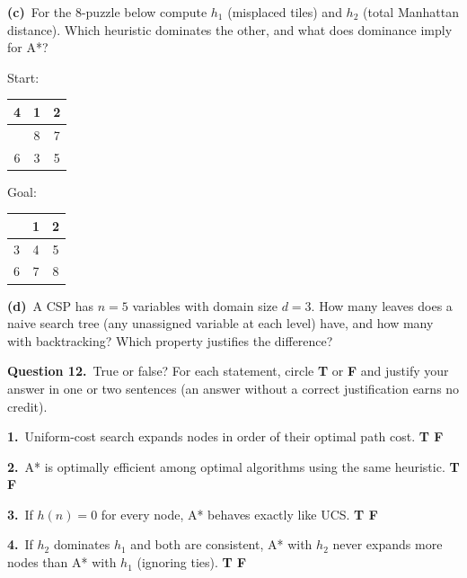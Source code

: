 \documentclass[11pt,a4paper]{article}
\renewcommand{\arraystretch}{1.25}
\newcommand{\question}[1]{\par\medskip\noindent\textbf{Question #1.}\ }
\newcommand{\subq}[1]{\par\smallskip\noindent\textbf{#1}\ }
\begin{document}
\subq{(c)}For the 8-puzzle below compute $h_1$ (misplaced tiles) and $h_2$ (total Manhattan distance). Which heuristic dominates the other, and what does dominance imply for A*?\par\begin{center}Start: {\renewcommand{\arraystretch}{1.3}\begin{tabular}{|c|c|c|}\hline 4 & 1 & 2 \\ \hline
 & 8 & 7 \\ \hline
6 & 3 & 5 \\ \hline\end{tabular}}\qquad Goal: {\renewcommand{\arraystretch}{1.3}\begin{tabular}{|c|c|c|}\hline  & 1 & 2 \\ \hline
3 & 4 & 5 \\ \hline
6 & 7 & 8 \\ \hline\end{tabular}}\end{center}
\begin{ansbox}[height=2.4cm]\end{ansbox}
\subq{(d)}A CSP has $n=5$ variables with domain size $d=3$. How many leaves does a naive search tree (any unassigned variable at each level) have, and how many with backtracking? Which property justifies the difference?
\begin{ansbox}[height=2.0cm]\end{ansbox}
\question{12}True or false?
For each statement, circle \textbf{T} or \textbf{F} and justify your answer in one or two sentences (an answer without a correct justification earns no credit).
\subq{1.}Uniform-cost search expands nodes in order of their optimal path cost. \hfill \textbf{T \quad F}
\begin{ansbox}[height=1.5cm]\end{ansbox}
\subq{2.}A* is optimally efficient among optimal algorithms using the same heuristic. \hfill \textbf{T \quad F}
\begin{ansbox}[height=1.5cm]\end{ansbox}
\subq{3.}If $h(n)=0$ for every node, A* behaves exactly like UCS. \hfill \textbf{T \quad F}
\begin{ansbox}[height=1.5cm]\end{ansbox}
\subq{4.}If $h_2$ dominates $h_1$ and both are consistent, A* with $h_2$ never expands more nodes than A* with $h_1$ (ignoring ties). \hfill \textbf{T \quad F}
\begin{ansbox}[height=1.5cm]\end{ansbox}
\end{document}
